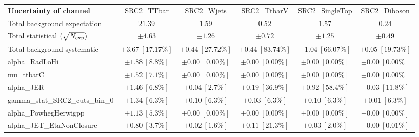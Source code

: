 
\begin{sidewaystable}
\begin{center}
\setlength{\tabcolsep}{0.0pc}
\begin{tabular*}{\textwidth}{@{\extracolsep{\fill}}lccccc}
\noalign{\smallskip}\hline\noalign{\smallskip}
{\bf Uncertainty of channel}                                    & SRC2\_TTbar            & SRC2\_Wjets            & SRC2\_TtbarV            & SRC2\_SingleTop            & SRC2\_Diboson            \\
\noalign{\smallskip}\hline\noalign{\smallskip}
Total background expectation             &  $21.39$        &  $1.59$        &  $0.52$        &  $1.57$        &  $0.24$       \\
\noalign{\smallskip}\hline\noalign{\smallskip}
Total statistical $(\sqrt{N_{\rm exp}})$              & $\pm 4.63$        & $\pm 1.26$        & $\pm 0.72$        & $\pm 1.25$        & $\pm 0.49$       \\
Total background systematic               & $\pm 3.67\ [17.17\%] $        & $\pm 0.44\ [27.72\%] $        & $\pm 0.44\ [83.74\%] $        & $\pm 1.04\ [66.07\%] $        & $\pm 0.05\ [19.73\%] $             \\
\noalign{\smallskip}\hline\noalign{\smallskip}
\noalign{\smallskip}\hline\noalign{\smallskip}
alpha\_RadLoHi         & $\pm 1.88\ [8.8\%] $          & $\pm 0.00\ [0.00\%] $          & $\pm 0.00\ [0.00\%] $          & $\pm 0.00\ [0.00\%] $          & $\pm 0.00\ [0.00\%] $       \\
mu\_ttbarC         & $\pm 1.52\ [7.1\%] $          & $\pm 0.00\ [0.00\%] $          & $\pm 0.00\ [0.00\%] $          & $\pm 0.00\ [0.00\%] $          & $\pm 0.00\ [0.00\%] $       \\
alpha\_JER         & $\pm 1.46\ [6.8\%] $          & $\pm 0.04\ [2.7\%] $          & $\pm 0.19\ [36.9\%] $          & $\pm 0.92\ [58.4\%] $          & $\pm 0.03\ [11.8\%] $       \\
gamma\_stat\_SRC2\_cuts\_bin\_0         & $\pm 1.34\ [6.3\%] $          & $\pm 0.10\ [6.3\%] $          & $\pm 0.03\ [6.3\%] $          & $\pm 0.10\ [6.3\%] $          & $\pm 0.01\ [6.3\%] $       \\
alpha\_PowhegHerwigpp         & $\pm 1.13\ [5.3\%] $          & $\pm 0.00\ [0.00\%] $          & $\pm 0.00\ [0.00\%] $          & $\pm 0.00\ [0.00\%] $          & $\pm 0.00\ [0.00\%] $       \\
alpha\_JET\_EtaNonClosure         & $\pm 0.80\ [3.7\%] $          & $\pm 0.02\ [1.6\%] $          & $\pm 0.11\ [21.3\%] $          & $\pm 0.03\ [2.0\%] $          & $\pm 0.00\ [0.01\%] $       \\

\end{tabular*}
\end{center}
\end{sidewaystable}
